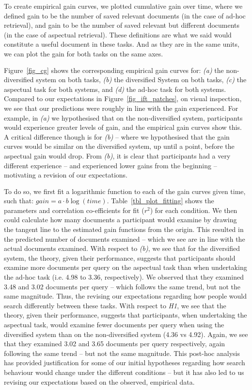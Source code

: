 To create empirical gain curves, we plotted cumulative gain over time, where we defined gain to be the number of saved relevant documents (in the case of ad-hoc retrieval), and gain to be the number of saved relevant but different documents (in the case of aspectual retrieval). These definitions are what we said would constitute a useful document in these tasks. And as they are in the same units, we can plot the gain for both tasks on the same axes.

Figure~\ref{fig_cg} shows the corresponding empirical gain curves for: \textit{(a)} the non-diversified system on both tasks, \textit{(b)} the diversified System on both tasks, \textit{(c)} the aspectual task for both systems, and \textit{(d)} the ad-hoc task for both systems. Compared to our expectations in Figure~\ref{fig_ift_patches}, on visual inspection, we see that our predictions were roughly in line with the gain experienced. For example, in \textit{(a)} we hypothesised that on the non-diversified system, participants would experience greater levels of gain, and the empirical gain curves show this. A critical difference though is for \textit{(b)} -- where we hypothesised that the gain curves would be similar on the diversified system, up until a point, before the aspectual gain would drop. From \textit{(b)}, it is clear that participants had a very different experience -- and experienced lower gains from the beginning -- motivating a revision of our expectations.

To do so, we first fit a logarithmic function to each of the gain curves given time, such that: $gain = a \cdot b \log(time)$. Table~\ref{tbl_plot_fitting} shows the parameters and correlation co-efficients for fit ($r^2$) for each condition. We then could calculate how many documents a participant would examine by drawing the tangent line to the estimated gain functions from the origin. This resulted in the predicted number of documents examined -- which we see are in line with the actual documents examined. With respect to \textit{(b)}, we see that for the diversified system, the theory, given their performance, suggests that participants should examine more documents per query on the aspectual task than when undertaking the ad-hoc task (i.e. 4.98 to 3.36, respectively). We observed that they examined 3.48 and 3.02 documents per query -- which follows the same trend, but not the same magnitude. Thus, the revising our expectations regarding how people would search differently between these tasks. With respect to \textit{H1}, we see that the theory, given their performance, suggests that participants, when undertaking the aspectual task, would examine fewer documents per query when using the diversified system than on the non-diversified system (4.36 vs 4.92). Again, we see that they examined 3.02 and 3.65 documents per query respectively, again following the same trend -- but not the same magnitude. This post-hoc analysis has provided justification for some of our initial hypotheses regarding how search behaviour would change under the different conditions -- but it has also led to us revising our expectations based on the observed, empirical data.

